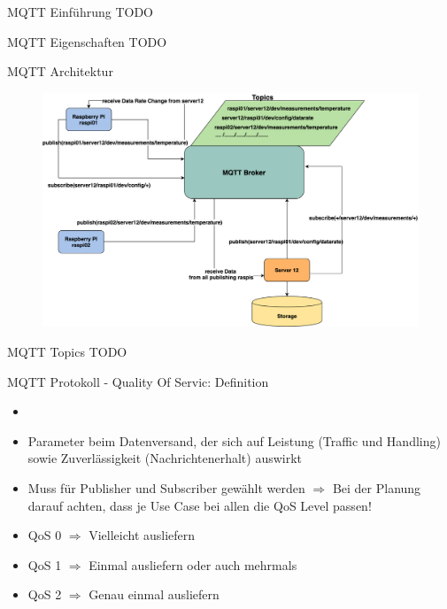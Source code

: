 \begin{frame}{MQTT Einführung}
    TODO
\end{frame}

\begin{frame}{MQTT Eigenschaften}
    TODO
\end{frame}


\begin{frame}{MQTT Architektur}
      \begin{figure}[!htb]
  \hspace*{5mm}
        \includegraphics[scale=0.15]{7-datenaustausch/img/mqttarch} 
    \end{figure}
\end{frame}


\begin{frame}{MQTT Topics}
    TODO
\end{frame}

\begin{frame}{MQTT Protokoll - Quality Of Servic: Definition}
   \begin{itemize}
        \setlength{\itemindent}{1.4in}
        \item [\textbf{Quality of Service (QoS}]
    \end{itemize}
    \begin{itemize}
        \item Parameter beim Datenversand, der sich auf Leistung (Traffic und Handling) sowie Zuverlässigkeit (Nachrichtenerhalt) auswirkt
        \item Muss für Publisher und Subscriber gewählt werden $\Rightarrow$ Bei der Planung darauf achten, dass je Use Case bei allen die QoS Level passen!
        \item QoS 0 $\Rightarrow$ Vielleicht ausliefern
        \item QoS 1 $\Rightarrow$ Einmal ausliefern oder auch mehrmals
        \item QoS 2 $\Rightarrow$ Genau einmal ausliefern
    \end{itemize} 
\end{frame}

